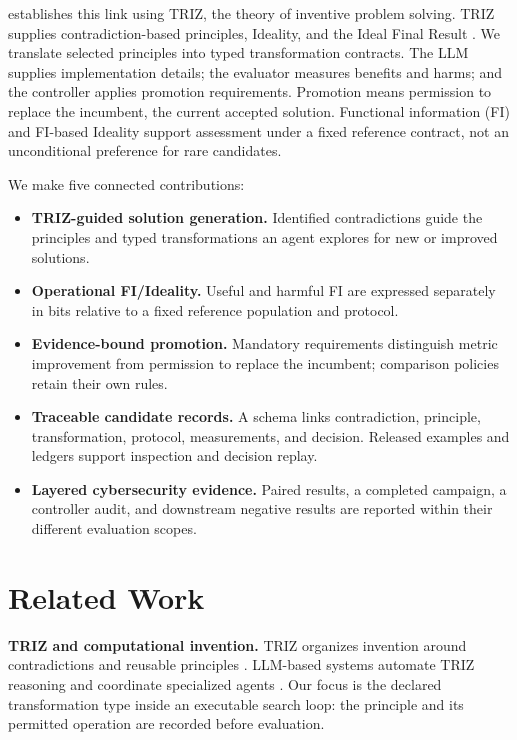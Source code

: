 \documentclass[sigconf]{acmart}
\begin{document}
\triza{} establishes this link using TRIZ, the theory of inventive problem
solving. TRIZ supplies contradiction-based principles, Ideality, and the
Ideal Final Result \citep{altshuller1984}. We translate selected principles
into typed transformation contracts. The LLM supplies implementation
details; the evaluator measures benefits and harms; and the controller
applies promotion requirements. Promotion means permission to replace
the incumbent, the current accepted solution. Functional information (FI)
and FI-based Ideality support assessment under a fixed reference contract,
not an unconditional preference for rare candidates.

We make five connected contributions:
\begin{itemize}
\item \textbf{TRIZ-guided solution generation.} Identified contradictions
guide the principles and typed transformations an agent explores for new
or improved solutions.
\item \textbf{Operational FI/Ideality.} Useful and harmful FI are expressed
separately in bits relative to a fixed reference population and protocol.
\item \textbf{Evidence-bound promotion.} Mandatory requirements distinguish
metric improvement from permission to replace the incumbent; comparison
policies retain their own rules.
\item \textbf{Traceable candidate records.} A schema links contradiction,
principle, transformation, protocol, measurements, and decision. Released
examples and ledgers support inspection and decision replay.
\item \textbf{Layered cybersecurity evidence.} Paired results, a completed
campaign, a controller audit, and downstream negative results are reported
within their different evaluation scopes.
\end{itemize}

\section{Related Work}
\label{sec:related-work}

\textbf{TRIZ and computational invention.} TRIZ organizes invention around
contradictions and reusable principles \citep{altshuller1984,mann2004}.
LLM-based systems automate TRIZ reasoning and coordinate specialized
agents \citep{jiang2025,szczepanik2025}. Our focus is the declared
transformation type inside an executable search loop: the principle
and its permitted operation are recorded before evaluation.
\end{document}
